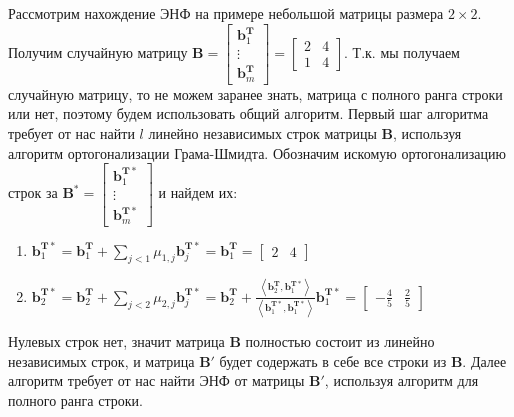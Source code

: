 Рассмотрим нахождение ЭНФ на примере небольшой матрицы размера $ 2 \times 2 $. Получим случайную матрицу $ \mathbf{B} =
\left[ \begin{array}{cccc}
\mathbf{b}^{\mathbf{T}}_1 \\
\vdots \\
\mathbf{b}^{\mathbf{T}}_m
\end{array} \right]
=
\left[ \begin{array}{cccc}
2 & 4 \\
1 & 4
\end{array} \right] $. Т.к. мы получаем случайную матрицу, то не можем заранее знать, матрица с полного ранга строки или нет, поэтому будем использовать общий алгоритм. Первый шаг алгоритма требует от нас найти $ l $ линейно независимых строк матрицы $ \mathbf{B} $, используя алгоритм ортогонализации Грама-Шмидта. Обозначим искомую ортогонализацию строк за $ \mathbf{B}^* = \left[ \begin{array}{cccc}
\mathbf{b}^{\mathbf{T}*}_1 \\
\vdots \\
\mathbf{b}^{\mathbf{T}*}_m
\end{array} \right] $ и найдем их:

\begin{enumerate}

\item $ \mathbf{b}^{\mathbf{T}*}_1 = \mathbf{b}^{\mathbf{T}}_1 + \sum\limits_{j < 1} \mu_{1, j}\mathbf{b}^{\mathbf{T}*}_j = \mathbf{b}^{\mathbf{T}}_1 = \left[ \begin{array}{cccc}
2 & 4
\end{array}
\right]$

\item $ \mathbf{b}^{\mathbf{T}*}_2 = \mathbf{b}^{\mathbf{T}}_2 + \sum\limits_{j < 2} \mu_{2, j}\mathbf{b}^{\mathbf{T}*}_j = \mathbf{b}^{\mathbf{T}}_2 + \frac{\left\langle \mathbf{b}^{\mathbf{T}}_2, \mathbf{b}^{\mathbf{T}*}_1 \right\rangle}{\left\langle \mathbf{b}^{\mathbf{T}*}_1, \mathbf{b}^{\mathbf{T}*}_1 \right\rangle} \mathbf{b}^{\mathbf{T}*}_1 = \left[ \begin{array}{cccc}
-\frac{4}{5} & \frac{2}{5}
\end{array}
\right]$

\end{enumerate}

Нулевых строк нет, значит матрица $ \mathbf{B} $ полностью состоит из линейно независимых строк, и матрица $ \mathbf{B}' $ будет содержать в себе все строки из $ \mathbf{B} $. Далее алгоритм требует от нас найти ЭНФ от матрицы $ \mathbf{B}' $, используя алгоритм для полного ранга строки.

